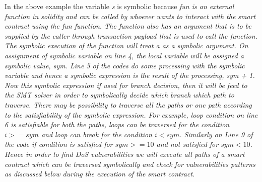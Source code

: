 In the above example the variable \emph{s} is symbolic because \em{fun} is an external function in solidity and can be called by whoever wants to interact with the smart contract using the \emph{fun} function. The function also has an argument that is to be supplied by the caller through transaction payload that is used to call the function. The symbolic execution of the function will treat \em{a} as a symbolic argument. On assignment of symbolic variable on line 4, the local variable will be assigned a symbolic value, \em{sym}. Line 5 of the codes do some processing with the symbolic variable and hence a symbolic expression is the result of the processing, \em{sym + 1}. Now this symbolic expression if used for branch decision, then it will be feed to the SMT solver in order to symbolically decide which branch which path to traverse. There may be possibility to traverse all the paths or one path according to the satisfiability of the symbolic expression. For example, loop condition on line 6 is satisfiable for both the paths, loops can be traversed for the condition $i >= sym$ and loop can break for the condition $i < sym$. Similarly on Line 9 of the code if condition is satisfied for $sym >= 10$ and not satisfied for $sym < 10$.\\
Hence in order to find DoS vulnerabilities we will execute all paths of a smart contract which can be traversed symbolically and check for vulnerabilities patterns as discussed below during the execution of the smart contract.
